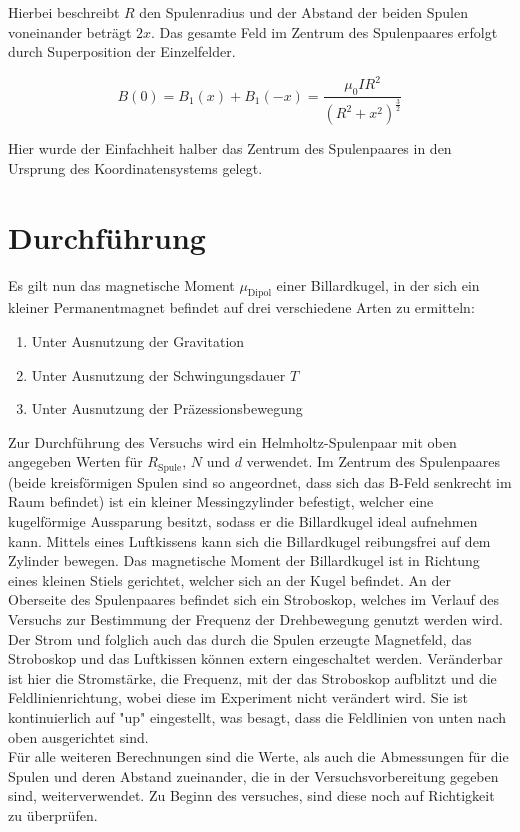 Hierbei beschreibt $R$ den Spulenradius und der Abstand der beiden Spulen voneinander beträgt $2x$.
Das gesamte Feld im Zentrum des Spulenpaares erfolgt durch Superposition der Einzelfelder.

\begin{equation*}
B(0) = B_1(x) + B_1(-x) = \frac{\mu_0 I R^2}{(R^2 + x^2)^\frac{3}{2}}
\end{equation*}

Hier wurde der Einfachheit halber das Zentrum des Spulenpaares in den Ursprung des Koordinatensystems gelegt.


\section{Durchführung}
Es gilt nun das magnetische Moment $\mu_\text{Dipol}$ einer Billardkugel, in der sich ein kleiner Permanentmagnet befindet auf drei verschiedene Arten
zu ermitteln:
\begin{enumerate}
\item Unter Ausnutzung der Gravitation \\
\item Unter Ausnutzung der Schwingungsdauer $T$ \\
\item Unter Ausnutzung der Präzessionsbewegung \\
\end{enumerate}
Zur Durchführung des Versuchs wird ein Helmholtz-Spulenpaar mit oben angegeben Werten für $R_\text{Spule}$, $N$ und $d$ verwendet. Im Zentrum des Spulenpaares
(beide kreisförmigen Spulen sind so angeordnet, dass sich das B-Feld senkrecht im Raum befindet) ist ein kleiner Messingzylinder befestigt, welcher
eine kugelförmige Aussparung besitzt, sodass er die Billardkugel ideal aufnehmen kann. Mittels eines Luftkissens kann sich die Billardkugel
reibungsfrei auf dem Zylinder bewegen. Das magnetische Moment der Billardkugel ist in Richtung eines kleinen Stiels gerichtet, welcher sich an der Kugel befindet.
An der Oberseite des Spulenpaares befindet sich ein Stroboskop, welches im Verlauf des Versuchs zur Bestimmung der Frequenz der Drehbewegung genutzt werden wird.
Der Strom und folglich auch das durch die Spulen erzeugte Magnetfeld, das Stroboskop und das Luftkissen können extern eingeschaltet werden.
Veränderbar ist hier die Stromstärke, die Frequenz, mit der das Stroboskop aufblitzt und die Feldlinienrichtung, wobei diese im Experiment nicht
verändert wird. Sie ist kontinuierlich auf "up" eingestellt, was besagt, dass die Feldlinien von unten nach oben ausgerichtet sind.\\
Für alle weiteren Berechnungen sind die Werte, als auch die Abmessungen für die Spulen und deren Abstand zueinander, die in der Versuchsvorbereitung
gegeben sind, weiterverwendet. Zu Beginn des versuches, sind diese noch auf Richtigkeit zu überprüfen.

